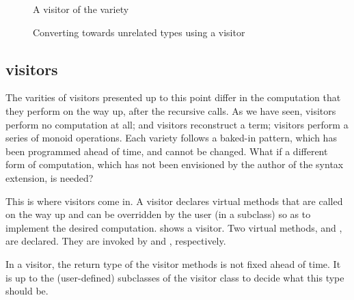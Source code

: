 \documentclass[11pt,a4paper,twoside]{article}
\begin{document}


\begin{figure}[p]
\vspace{-\baselineskip}
\caption{A visitor of the \fold variety}
\label{fig:expr00fold}
\end{figure}

\begin{figure}[p]
\caption{Converting towards unrelated types using a \fold visitor}
\label{fig:fold}
\end{figure}

\subsection{\fold visitors}
\label{sec:intro:fold}

The varities of visitors presented up to this point differ in the computation
that they perform on the way up, after the recursive calls. As we have seen,
\iter visitors perform no computation at all; \map and \mapendo visitors
reconstruct a term; \reduce visitors perform a series of monoid operations.
Each variety follows a baked-in pattern, which has been programmed ahead of
time, and cannot be changed. What if a different form of computation, which
has not been envisioned by the author of the \visitors syntax extension, is
needed?

This is where \fold visitors come in. A \fold visitor declares virtual methods
that are called on the way up and can be overridden by the user (in a
subclass) so as to implement the desired computation. 
shows a \fold visitor. Two virtual methods, 
and , are declared. They are invoked by
 and , respectively.

In a \fold visitor, the return type of the visitor methods is not fixed ahead
of time. It is up to the (user-defined) subclasses of the visitor class to
decide what this type should be.
\end{document}

